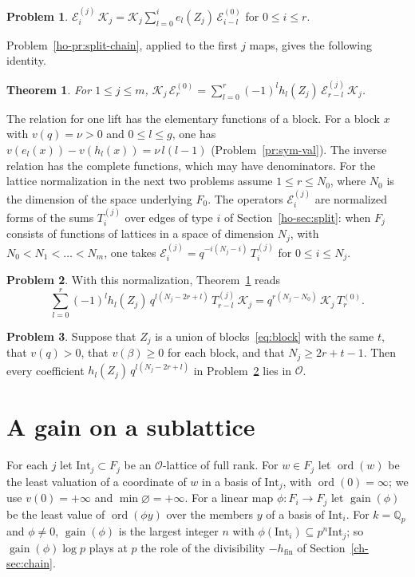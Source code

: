\documentclass[reqno]{amsart}
\theoremstyle{definition}
\newtheorem{problem}{Problem}[section]
\theoremstyle{plain}
\newtheorem{theorem}{Theorem}[section]
\theoremstyle{remark}
\newcommand{\Q}{\mathbb{Q}}
\newcommand{\Oc}{\mathcal{O}}
\newcommand{\Ec}{\mathcal{E}}
\newcommand{\Kc}{\mathcal{K}}
\newcommand{\Int}{\mathrm{Int}}
\newcommand{\gain}{\operatorname{gain}}
\newcommand{\ord}{\operatorname{ord}}
\begin{document}
\begin{problem}\label{pr:forward}
\(\Ec^{(j)}_i\, \Kc_j = \Kc_j \sum_{l=0}^i e_l(Z_j)\, \Ec^{(0)}_{i-l}\) for \(0 \le i \le r\).
\end{problem}

Problem~\ref{ho-pr:split-chain}, applied to the first \(j\) maps, gives the following identity.

\begin{theorem}\label{thm:move}
For \(1 \le j \le m\),
\(\displaystyle \Kc_j\, \Ec^{(0)}_r = \sum_{l=0}^r (-1)^l h_l(Z_j)\, \Ec^{(j)}_{r-l}\, \Kc_j\).
\end{theorem}

The relation for one lift has the elementary functions of a block.  For a block \(x\) with \(v(q)=\nu>0\) and \(0\le l\le g\), one has \(v(e_l(x))-v(h_l(x))=\nu\,l(l-1)\) (Problem~\ref{pr:sym-val}).  The inverse relation has the complete functions, which may have denominators.  For the lattice normalization in the next two problems assume \(1 \le r \le N_0\), where \(N_0\) is the dimension of the space underlying \(F_0\).  The operators \(\Ec^{(j)}_i\) are normalized forms of the sums \(T^{(j)}_i\) over edges of type \(i\) of Section~\ref{ho-sec:split}: when \(F_j\) consists of functions of lattices in a space of dimension \(N_j\), with \(N_0 < N_1 < \dots < N_m\), one takes \(\Ec^{(j)}_i = q^{-i(N_j - i)}\, T^{(j)}_i\) for \(0 \le i \le N_j\).

\begin{problem}\label{pr:raw}
With this normalization, Theorem~\ref{thm:move} reads
\[
  \sum_{l=0}^r (-1)^l h_l(Z_j)\, q^{l(N_j - 2r + l)}\, T^{(j)}_{r-l}\, \Kc_j = q^{r(N_j - N_0)}\, \Kc_j\, T^{(0)}_r .
\]
\end{problem}

\begin{problem}\label{pr:integral}
Suppose that \(Z_j\) is a union of blocks~\eqref{eq:block} with the same \(t\), that \(v(q) > 0\), that \(v(\beta) \ge 0\) for each block, and that \(N_j \ge 2r + t - 1\).  Then every coefficient \(h_l(Z_j)\, q^{l(N_j - 2r + l)}\) in Problem~\ref{pr:raw} lies in \(\Oc\).
\end{problem}

\section{A gain on a sublattice}\label{sec:gain}

For each \(j\) let \(\Int_j \subset F_j\) be an \(\Oc\)-lattice of full rank.  For \(w \in F_j\) let \(\ord(w)\) be the least valuation of a coordinate of \(w\) in a basis of \(\Int_j\), with \(\ord(0) = \infty\); we use \(v(0) = +\infty\) and \(\min\varnothing = +\infty\).  For a linear map \(\phi \colon F_i \to F_j\) let \(\gain(\phi)\) be the least value of \(\ord(\phi y)\) over the members \(y\) of a basis of \(\Int_i\).  For \(k = \Q_p\) and \(\phi \ne 0\), \(\gain(\phi)\) is the largest integer \(n\) with \(\phi(\Int_i) \subseteq p^n \Int_j\); so \(\gain(\phi) \log p\) plays at \(p\) the role of the divisibility \(-h_{\mathrm{fin}}\) of Section~\ref{ch-sec:chain}.
\end{document}

